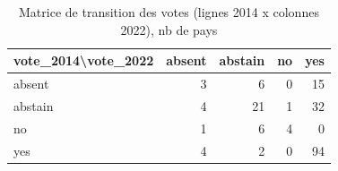 \begin{table}

\caption{Matrice de transition des votes (lignes 2014 x colonnes 2022), nb de pays}
\centering
\begin{tabular}[t]{lrrrr}
\toprule
vote\_2014\textbackslash{}vote\_2022 & absent & abstain & no & yes\\
\midrule
absent & 3 & 6 & 0 & 15\\
abstain & 4 & 21 & 1 & 32\\
no & 1 & 6 & 4 & 0\\
yes & 4 & 2 & 0 & 94\\
\bottomrule
\end{tabular}
\end{table}
